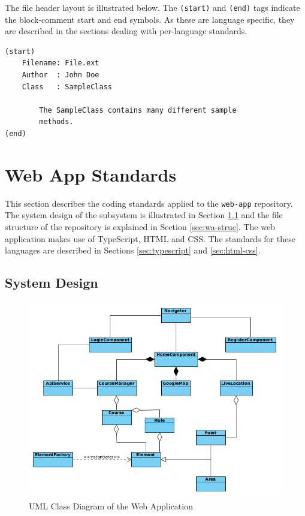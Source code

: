 \documentclass{article}
\begin{document}
    The file header layout is illustrated below. The \texttt{(start)} and
    \texttt{(end)} tags indicate the block-comment start and end symbols.
    As these are language specific, they are described in the sections
    dealing with per-language standards.

    \begin{lstlisting}
(start)
    Filename: File.ext
    Author  : John Doe
    Class   : SampleClass

        The SampleClass contains many different sample
        methods.
(end)
    \end{lstlisting}

    \newpage


    \section{Web App Standards}
    \label{sec:web-app}

    This section describes the coding standards applied to the \texttt{web-app}
    repository. The system design of the subsystem is illustrated in Section
    \ref{sec:wa-design} and the file structure of the repository is explained
    in Section \ref{sec:wa-struc}. The web application makes use of TypeScript,
    HTML and CSS. The standards for these languages are described in Sections
    \ref{sec:typescript} and \ref{sec:html-css}.

    \subsection{System Design}
    \label{sec:wa-design}

    \begin{figure}[h!]
        \centering
        \includegraphics[scale=0.6]{WebClassDiagram}
        \caption{UML Class Diagram of the Web Application}
        \label{fig:mobuml}
    \end{figure}
\end{document}
